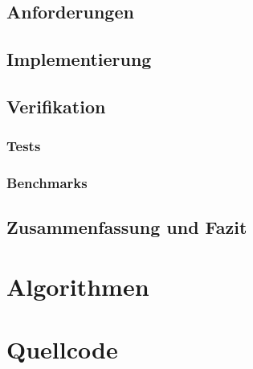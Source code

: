 \documentclass[a4paper,12pt,oneside,german,toc=bibliography]{scrbook}
\theoremstyle{definition}
\theoremstyle{plain}
\numberwithin{equation}{section}
\begin{document}
\section{Anforderungen}


\section{Implementierung}


\section{Verifikation}
    \subsection{Tests}     
    \subsection{Benchmarks}


\section{Zusammenfassung und Fazit}




\appendix


\chapter{Algorithmen}


\chapter{Quellcode}





\end{document}
